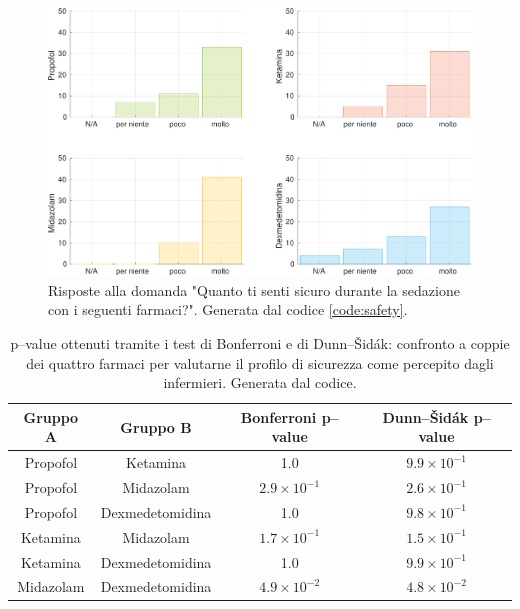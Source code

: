 \vfill

\begin{figure}[!h]
    \centering
    \includegraphics[width=1\textwidth]{Figure/sicurezza-istogrammi.pdf}
    \caption{Risposte alla domanda "Quanto ti senti sicuro durante la sedazione con i seguenti farmaci?". Generata dal codice \ref{code:safety}.}
    \label{fig:sicurezza1}
\end{figure}

\vfill

\newpage

\bgroup
\def\arraystretch{1.5}
\begin{table}[!h]
    \centering
    \begin{tabular}{c|c|c|c}
         Gruppo A & Gruppo B & Bonferroni p--value & Dunn--Šidák p--value\\ \hline
       Propofol & Ketamina & 1.0 & $9.9 \times 10^{-1}$ \\
       Propofol & Midazolam  & $2.9 \times 10^{-1}$ & $2.6 \times 10^{-1}$\\
       Propofol & Dexmedetomidina & 1.0 & $9.8 \times 10^{-1}$\\
       Ketamina & Midazolam & $1.7\times10^{-1}$ & $1.5\times10^{-1}$\\
       Ketamina & Dexmedetomidina & 1.0 & $9.9\times10^{-1}$\\
       Midazolam & Dexmedetomidina & $4.9 \times 10^{-2}$ & $4.8 \times 10^{-2}$\\
       
    \end{tabular}
    \caption{p--value ottenuti tramite i test di Bonferroni e di Dunn--Šidák: confronto a coppie dei quattro farmaci per valutarne il profilo di sicurezza come percepito dagli infermieri. Generata dal codice.}
    \label{tab:sicurezzatest}
\end{table}
\egroup

